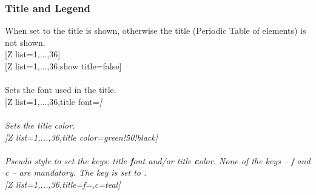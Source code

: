 \vfill%
\subsubsection{\texorpdfstring{ Title and Legend}{Title and Legend}}\vspace{6pt}
\label{option_show title}%
%
{When set to  the title is shown, otherwise the title (Periodic Table of elements) is not shown.}%
\\ [5pt][Z list={1,...,36}]%
\\ [10pt]\makebox[\linewidth][c]{\scalebox{.6}{\pgfPT[Z list={1,...,36}]}}%
\newpage%
[Z list={1,...,36},show title=false]%
\\ [10pt]\makebox[\linewidth][c]{\scalebox{.6}{\pgfPT[Z list={1,...,36},show title=false]}}%
\\ [0pt]\pgfPTendoption%
\label{option_title font}%
%
{Sets the font used in the title.}%
\\ [5pt][Z list={1,...,36},title font=\string\Huge\string\itshape]%
\\ [10pt]\makebox[\linewidth][c]{\scalebox{.6}{\pgfPT[Z list={1,...,36},title font=\Huge\itshape]}}%
\\ [0pt]\pgfPTendoption%
\label{option_title color}%
%
{Sets the title color.}%
\\ [5pt][Z list={1,...,36},title color=green!50!black]%
\\ [10pt]\makebox[\linewidth][c]{\scalebox{.6}{\pgfPT[Z list={1,...,36},title color=green!50!black]}}%
\\ [0pt]\pgfPTendoption%
\vfill%
\label{style_title}%
%
{\textit{Pseudo style} to set the keys: title \textbf{f}ont and/or title \textbf{c}olor. None of the \textit{keys} -- f and c -- are mandatory.
The key  is set to .
\\ [3pt]%
}%
\vfill%
\newpage%
[Z list={1,...,36},title={f=\string\Huge,c=teal}]%
\\ [10pt]\makebox[\linewidth][c]{\scalebox{.6}{\pgfPT[Z list={1,...,36},title={f=\Huge,c=teal}]}}%
